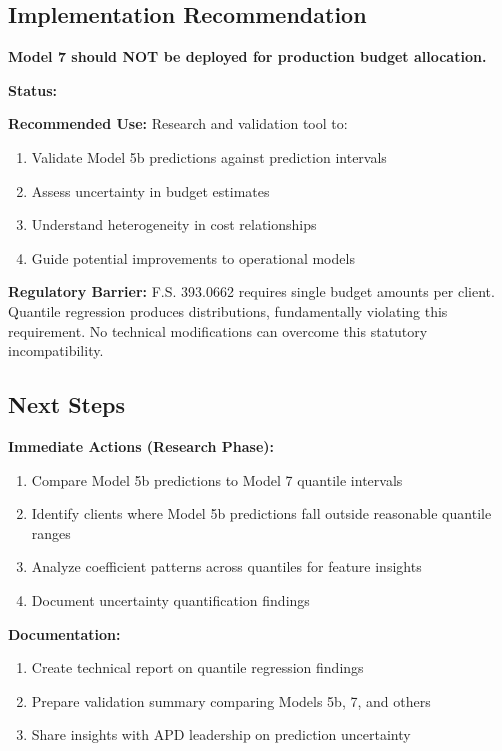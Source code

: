 \subsection{Implementation Recommendation}

\begin{tcolorbox}[colback=red!10!white, colframe=red!75!black, title=\textbf{RECOMMENDATION: RESEARCH USE ONLY}]
\textbf{Model 7 should NOT be deployed for production budget allocation.}

\textbf{Status:} \ModelSevenDeploymentStatus

\textbf{Recommended Use:} Research and validation tool to:
\begin{enumerate}
\item Validate Model 5b predictions against prediction intervals
\item Assess uncertainty in budget estimates
\item Understand heterogeneity in cost relationships
\item Guide potential improvements to operational models
\end{enumerate}

\textbf{Regulatory Barrier:} F.S. 393.0662 requires single budget amounts per client. Quantile regression produces distributions, fundamentally violating this requirement. No technical modifications can overcome this statutory incompatibility.
\end{tcolorbox}

\subsection{Next Steps}

\textbf{Immediate Actions (Research Phase):}
\begin{enumerate}
\item Compare Model 5b predictions to Model 7 quantile intervals
\item Identify clients where Model 5b predictions fall outside reasonable quantile ranges
\item Analyze coefficient patterns across quantiles for feature insights
\item Document uncertainty quantification findings
\end{enumerate}

\textbf{Documentation:}
\begin{enumerate}
\item Create technical report on quantile regression findings
\item Prepare validation summary comparing Models 5b, 7, and others
\item Share insights with APD leadership on prediction uncertainty
\end{enumerate}

